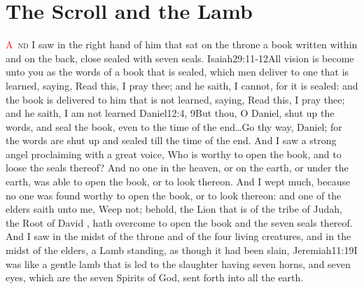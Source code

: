 \chapter{The Scroll and the Lamb}
\lettrine[lines=3,slope=0.5em]{\textcolor{red}{A}}{\ nd} I saw in the right hand of him that sat on the throne a book written within and on the back, close sealed with seven seals.%
 					{Isaiah}{29:11-12}{All vision is become unto you as the words of a book that is sealed, which men deliver to one that is learned, saying, Read this, I pray thee; and he saith, I cannot, for it is sealed: and the book is delivered to him that is not learned, saying, Read this, I pray thee; and he saith, I am not learned}%
 					{Daniel}{12:4, 9}{But thou, O Daniel, shut up the words, and seal the book, even to the time of the end\ldots Go thy way, Daniel; for the words are shut up and sealed till the time of the end.} %
And I saw a strong angel proclaiming with a great voice, Who is worthy to open the book, and to loose the seals thereof? %
And no one in the heaven, or on the earth, or under the earth, was able to open the book, or to look thereon. %
And I wept much, because no one was found worthy to open the book, or to look thereon: %
and one of the elders saith unto me, Weep not; behold, the Lion that is of the tribe of Judah,%
 the Root of David%
 , hath overcome to open the book and the seven seals thereof. %
And I saw in the midst of the throne and of the four living creatures, and in the midst of the elders, a Lamb standing, as though it had been slain,%
					  {Jeremiah}{11:19}{I was like a gentle lamb that is led to the slaughter}
 having seven horns, and seven eyes, which are the seven Spirits of God, sent forth into all the earth.%
